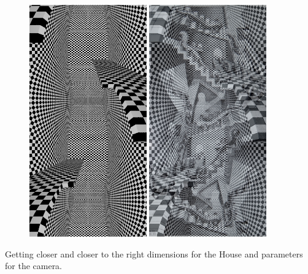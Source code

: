 \documentclass[12pt, a4paper]{article}
\begin{document}
\begin{center}
\begin{figure}[H]
\centering
\includegraphics[height=10cm]{./XL-51_7.png}
\includegraphics[height=10cm]{./checkDimensionViewPoint_4.png}\\
\end{figure}
\end{center}

Getting closer and closer to the right dimensions for the House and parameters for the camera.\\
\end{document}
